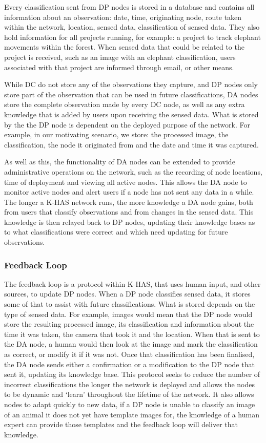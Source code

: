 	Every classification sent from DP nodes is stored in a database and contains all information about an observation: date, time, originating node, route taken within the network, location, sensed data, classification of sensed data. They also hold information for all projects running, for example: a project to track elephant movements within the forest. When sensed data that could be related to the project is received, such as an image with an elephant classification, users associated with that project are informed through email, or other means.
	
	While DC do not store any of the observations they capture, and DP nodes only store part of the observation that can be used in future classifications, DA nodes store the complete observation made by every DC node, as well as any extra knowledge that is added by users upon receiving the sensed data. What is stored by the the DP node is dependent on the deployed purpose of the network. For example, in our motivating scenario, we store: the processed image, the classification, the node it originated from and the date and time it was captured.
	
	As well as this, the functionality of DA nodes can be extended to provide administrative operations on the network, such as the recording of node locations, time of deployment and viewing all active nodes. This allows the DA node to monitor active nodes and alert users if a node has not sent any data in a while. The longer a K-HAS network runs, the more knowledge a DA node gains, both from users that classify observations and from changes in the sensed data. This knowledge is then relayed back to DP nodes, updating their knowledge bases as to what classifications were correct and which need updating for future observations.

	\subsubsection{Feedback Loop}
	The feedback loop is a protocol within K-HAS, that uses human input, and other sources, to update DP nodes. When a DP node classifies sensed data, it stores some of that to assist with future classifications. What is stored depends on the type of sensed data. For example, images would mean that the DP node would store the resulting processed image, its classification and information about the time it was taken, the camera that took it and the location. When that is sent to the DA node, a human would then look at the image and mark the classification as correct, or modify it if it was not. Once that classification has been finalised, the DA node sends either a confirmation or a modification to the DP node that sent it, updating its knowledge base. This protocol seeks to reduce the number of incorrect classifications the longer the network is deployed and allows the nodes to be dynamic and `learn' throughout the lifetime of the network. It also allows nodes to adapt quickly to new data, if a DP node is unable to classify an image of an animal it does not yet have template images for, the knowledge of a human expert can provide those templates and the feedback loop will deliver that knowledge.
	
